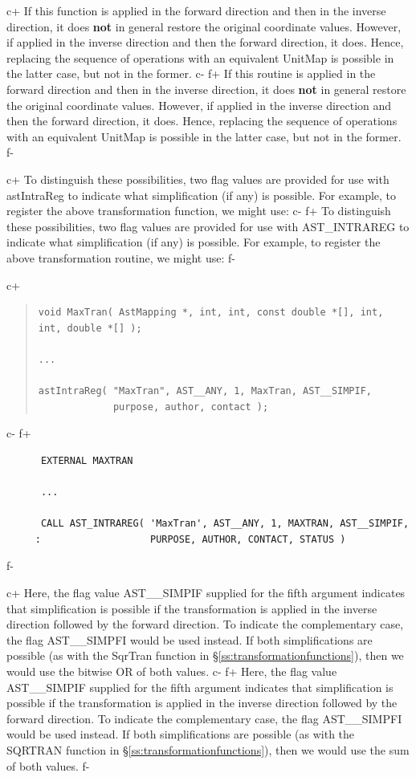 \documentclass[twoside,11pt]{article}
\newcommand{\secref}[1]{\S\ref{#1}}
\newcommand{\secref}[1]{\ref{#1}}
\begin{document}
c+
If this function is applied in the forward direction and then in the
inverse direction, it does {\bf{not}} in general restore the original
coordinate values. However, if applied in the inverse direction and
then the forward direction, it does. Hence, replacing the sequence of
operations with an equivalent UnitMap is possible in the latter case,
but not in the former.
c-
f+
If this routine is applied in the forward direction and then in the
inverse direction, it does {\bf{not}} in general restore the original
coordinate values. However, if applied in the inverse direction and
then the forward direction, it does. Hence, replacing the sequence of
operations with an equivalent UnitMap is possible in the latter case,
but not in the former.
f-

c+
To distinguish these possibilities, two flag values are provided for
use with astIntraReg to indicate what simplification (if any) is
possible. For example, to register the above transformation function,
we might use:
c-
f+
To distinguish these possibilities, two flag values are provided for
use with AST\_INTRAREG to indicate what simplification (if any) is
possible. For example, to register the above transformation routine,
we might use:
f-

c+
\begin{quote}
\small
\begin{verbatim}
void MaxTran( AstMapping *, int, int, const double *[], int, int, double *[] );

...

astIntraReg( "MaxTran", AST__ANY, 1, MaxTran, AST__SIMPIF,
             purpose, author, contact );
\end{verbatim}
\normalsize
\end{quote}
c-
f+
\small
\begin{verbatim}
      EXTERNAL MAXTRAN

      ...

      CALL AST_INTRAREG( 'MaxTran', AST__ANY, 1, MAXTRAN, AST__SIMPIF,
     :                   PURPOSE, AUTHOR, CONTACT, STATUS )
\end{verbatim}
\normalsize
f-

c+
Here, the flag value AST\_\_SIMPIF supplied for the fifth argument
indicates that simplification is possible if the transformation is
applied in the inverse direction followed by the forward direction. To
indicate the complementary case, the flag AST\_\_SIMPFI would be used
instead. If both simplifications are possible (as with the SqrTran
function in \secref{ss:transformationfunctions}), then we would use
the bitwise OR of both values.
c-
f+
Here, the flag value AST\_\_SIMPIF supplied for the fifth argument
indicates that simplification is possible if the transformation is
applied in the inverse direction followed by the forward direction. To
indicate the complementary case, the flag AST\_\_SIMPFI would be used
instead. If both simplifications are possible (as with the SQRTRAN
function in \secref{ss:transformationfunctions}), then we would use
the sum of both values.
f-
\end{document}
